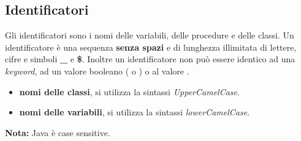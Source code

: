 \documentclass[../main.tex]{subfiles}
\begin{document}
\vspace{1cm}
\subsection{Identificatori}
Gli identificatori sono i nomi delle variabili, delle procedure e delle classi. Un identificatore è una sequenza \textbf{senza spazi} e
di lunghezza illimitata di lettere, cifre e simboli \textbf{\_} e \textbf{\$}. Inoltre un identificatore non può essere identico
ad una \textit{keyword}, ad un valore booleano ( o ) o al valore .

\begin{itemize}
    \item \textbf{nomi delle classi}, si utilizza la sintassi \textit{UpperCamelCase}.
    \item\textbf{nomi delle variabili}, si utilizza la sintassi \textit{lowerCamelCase}.

\end{itemize}

\textbf{Nota:} Java è case sensitive.
\end{document}
